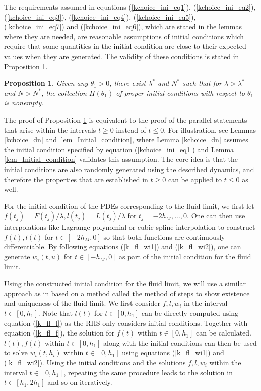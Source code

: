 \documentclass[12pt]{article}
\numberwithin{equation}{section}  %
\newtheorem{prop}[thm]{Proposition}
\begin{document}
The requirements assumed in equations (\ref{kchoice_ini_eq1}), (\ref{kchoice_ini_eq2}), (\ref{kchoice_ini_eq3}), (\ref{kchoice_ini_eq4}), (\ref{kchoice_ini_eq5}), (\ref{kchoice_ini_eq7}) and (\ref{kchoice_ini_eq6}), which are stated in the lemmas where they are needed, are reasonable assumptions of initial conditions which require that some quantities in the initial condition are close to their expected values when they are generated. The validity of these conditions is stated in Proposition \ref{k_prop_ini}.

\begin{prop}\label{k_prop_ini}
Given any $\theta_1>0$, there exist $\lambda^*$ and $N^*$ such that for $\lambda>\lambda^*$ and $N>N^*$, the collection $\Pi(\theta_1)$ of proper initial conditions with respect to $\theta_1$ is nonempty.
\end{prop}
The proof of Proposition \ref{k_prop_ini} is equivalent to the proof of the parallel statements that arise within the intervals $t\geq0$ instead of $t\leq 0$. 
For illustration, see Lemmas \ref{kchoice_dn} and \ref{lem_Initial_condition}, where Lemma \ref{kchoice_dn} assumes the initial condition specified by equation (\ref{kchoice_ini_eq1}) and Lemma \ref{lem_Initial_condition} validates this assumption. The core idea is that the initial conditions are also randomly generated using the described dynamics, and therefore the properties that are established in $t\geq0$ can be applied to $t\leq0$ as well.

For the initial condition of the PDEs corresponding to the fluid limit, we first let $f(t_j)=F(t_j)/\lambda, l(t_j)=L(t_j)/\lambda$ for  $t_j=-2h_M,...,0$. One can then use interpolations like Lagrange polynomial or cubic spline interpolation to construct $f(t),l(t)$ for $t\in[-2h_M,0]$ so that both functions are continuously differentiable. By following equations (\ref{k_fl_wi1}) and (\ref{k_fl_wi2}), one can generate $w_i(t,u)$ for $t\in[-h_M,0]$ as part of the initial condition for the fluid limit.

Using the constructed initial condition for the fluid limit, we will use a similar approach as in \cite{Ck21} based on a method called the method of steps \cite{driver2012ordinary} to show existence and uniqueness of the fluid limit. We first consider $f,l,w_i$ in the interval $t\in[0,h_1]$. Note that $l(t)$ for $t\in[0,h_1]$ can be directly computed using equation (\ref{k_fl_l}) as the RHS only considers initial conditions. Together with equation (\ref{k_fl_f}), the solution for $f(t)$ within $t\in[0,h_1]$ can be calculated. $l(t),f(t)$ within $t\in[0,h_1]$ along with the initial conditions can then be used to solve $w_i(t,h_i)$ within $t\in[0,h_1]$ using equations (\ref{k_fl_wi1}) and (\ref{k_fl_wi2}). Using the initial conditions and the solutions $f,l,w_i$ within the interval $t\in[0,h_1]$, repeating the same procedure leads to the solution in $t\in[h_1,2h_1]$ and so on iteratively.
\end{document}

